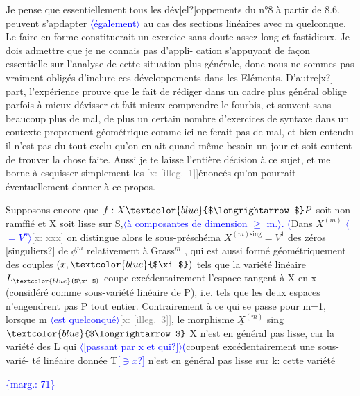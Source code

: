 \documentclass[11pt]{article}
\newcommand{\scanpage}[1]{\par\bigskip\noindent{\small\sffamily[scan #1]}\par}
\newcommand{\mspage}[1]{{\small\sffamily[p.\,#1]}}
\newcommand{\hand}[1]{\textcolor{blue}{#1}}
\newcommand{\inserted}[2][]{\textcolor{blue}{$\langle$#2$\rangle$}}
\newcommand{\margin}[1]{\textcolor{blue}{\{\textsf{marg.:} #1\}}}
\newcommand{\xout}[1]{\textcolor{gray}{[\textsf{x:} #1]}}
\newcommand{\unsure}[1]{[#1?]}
\newcommand{\illegible}[1]{[\textsf{illeg.\ #1}]}
\begin{document}
Je pense que essentiellement tous les dév\unsure{el}oppements du n°8 à
partir de 8.6. peuvent s'apdapter \inserted{également} au cas des sections linéaires avec
m quelconque. Le faire en forme constituerait un exercice sans doute
assez long et fastidieux. Je dois admettre que je ne connais pas d'appli-%
cation s'appuyant de façon essentielle sur l'analyse de cette situation
plus générale, donc nous ne sommes pas vraiment obligés d'inclure ces
développements dans les Eléments. D'autre\unsure{x} part, l'expérience prouve que
le fait de rédiger dans un cadre plus général oblige parfois à mieux
dévisser et fait mieux comprendre le fourbis, et souvent sans beaucoup
plus de mal, de plus un certain nombre d'exercices de syntaxe dans un
contexte proprement géométrique comme ici ne ferait pas de mal,-et
bien entendu il n'est pas du tout exclu qu'on en ait quand même besoin
un jour et soit content de trouver la chose faite. Aussi je te laisse
l'entière décision à ce sujet, et me borne à esquisser simplement les
\xout{\illegible{1}}énoncés qu'on pourrait éventuellement donner à ce propos.

Supposons encore que $f:X \hand{$\longrightarrow$} P$ soit non ramffié et X soit lisse sur
S,\inserted[typed]{à composantes de dimension \hand{$\geq$} m.}\hand{.} \hand{(}Dans $\underline{X}^{(m)}$ \inserted{$=V^o$}\xout{xxx} on distingue alors le sous-préschéma $\underline{X}^{(m)\mathrm{sing}} = V^1$
des zéros \unsure{singuliers} de $\phi^m$ relativement à Grass$^m$ , qui est aussi formé
géométriquement des couples $(x,\hand{$\xi$})$ tels que la variété linéaire $L_{\hand{$\xi$}}$
coupe excédentairement l'espace tangent à X en x (considéré comme
sous-variété linéaire de P), i.e. tels que les deux espaces n'engendrent
pas P tout entier. Contrairement à ce qui se passe pour m=1, lorsque
m \inserted[typed]{est quelconqué}\xout{\illegible{3}}, le morphisme $\underline{X}^{(m)}$ sing $\hand{$\longrightarrow$}$ X n'est en général pas
lisse, car la variété des L qui \inserted{\unsure{passant par x et qui}}\hand{(}coupent excédentairement une sous-varié-%
té linéaire donnée T\hand{\unsure{$\ni x$}} n'est en général pas lisse sur k: cette variété

\margin{71}

\clearpage
\scanpage{25/72}
\mspage{67}
\end{document}
